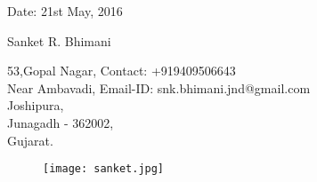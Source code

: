 \documentclass[12pt,a4paper,english]{article}
\begin{document}
	\begin{flushleft}
		Date: 21st May, 2016
	\end{flushleft}
	\begin{center}
		\huge{Sanket R. Bhimani}	
	\end{center}
	\hline
	\begin{flushleft}
		53,Gopal Nagar, \hspace{2.57in}Contact: +919409506643\\
		Near Ambavadi,	\hspace{2.57in}Email-ID: snk.bhimani.jnd@gmail.com\\
		Joshipura,\\
		Junagadh - 362002,\\
		Gujarat.
	\end{flushleft}
	\vspace{-0.6in}
	\begin{figure}[h]
		\begin{flushright}
			\texttt{[image: sanket.jpg]}
		\end{flushright}
	\end{figure}
	\hline
\end{document}
